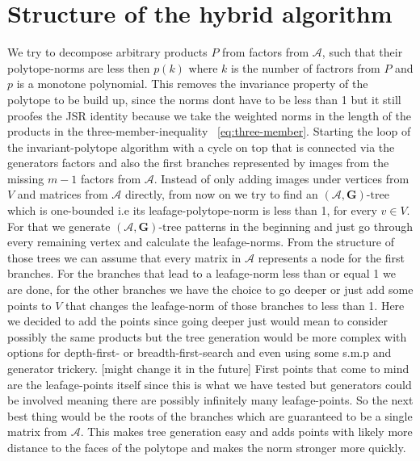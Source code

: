 

\section{Structure of the hybrid algorithm}

We try to decompose arbitrary products $P$ from factors from $\mathcal{A}$, such that their polytope-norms are less then $p(k)$ where $k$ is the number of factrors from $P$ and $p$ is a monotone polynomial.
This removes the invariance property of the polytope to be build up, since the norms dont have to be less than 1 but it still proofes the JSR identity because we take the weighted norms in the length of the products in the three-member-inequality ~\ref{eq:three-member}.
\newline 
Starting the loop of the invariant-polytope algorithm with a cycle on top that is connected via the generators factors and also the first branches represented by images from the missing $m-1$ factors from $\mathcal{A}$. Instead of only adding images under vertices from $V$ and matrices from $\mathcal{A}$ directly, from now on we try to find an $(\mathcal{A},\mathbf{G})\text{-tree}$ which is one-bounded i.e its leafage-polytope-norm is less than 1, for every $v \in V$.
For that we generate $(\mathcal{A},\mathbf{G})\text{-tree}$ patterns in the beginning and just go through every remaining vertex and calculate the leafage-norms. From the structure of those trees we can assume that every matrix in $\mathcal{A}$ represents a node for the first branches.
For the branches that lead to a leafage-norm less than or equal 1 we are done, for the other branches we have the choice to go deeper or just add some points to $V$ that changes the leafage-norm of those branches to less than 1. Here we decided to add the points since going deeper just would mean to consider possibly the same products but the tree generation would be more complex with options for depth-first- or breadth-first-search and even using some s.m.p and generator trickery. [might change it in the future]
\newline
First points that come to mind are the leafage-points itself since this is what we have tested but generators could be involved meaning there are possibly infinitely many leafage-points. So the next best thing would be the roots of the branches which are guaranteed to be a single matrix from $\mathcal{A}$. This makes tree generation easy and adds points with likely more distance to the faces of the polytope and makes the norm stronger more quickly.
